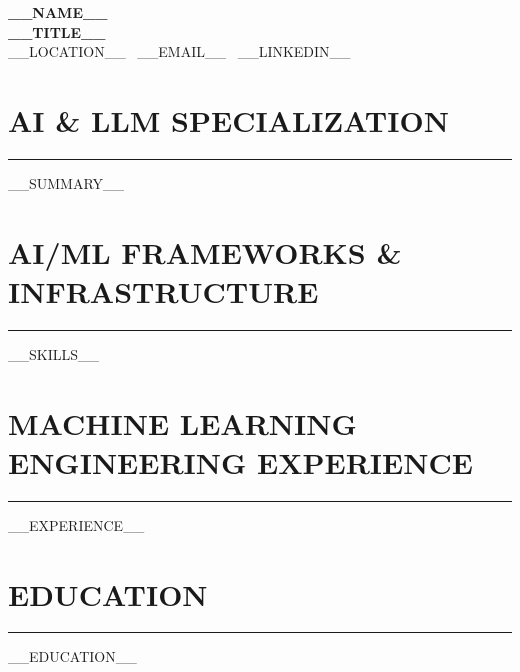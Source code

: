 \documentclass[10pt,letterpaper]{article}
\begin{document}
\begin{center}
    {\LARGE \textbf{__NAME__}} \\
    \vspace{2pt}
    \textbf{__TITLE__} \\
    __LOCATION__ \textbar\ __EMAIL__ \textbar\ __LINKEDIN__
\end{center}

\vspace{-6pt}
\section*{AI \& LLM SPECIALIZATION}
\vspace{-4pt}
\hrule
\vspace{4pt}
__SUMMARY__

\section*{AI/ML FRAMEWORKS \& INFRASTRUCTURE}
\vspace{-4pt}
\hrule
\vspace{4pt}
__SKILLS__

\section*{MACHINE LEARNING ENGINEERING EXPERIENCE}
\vspace{-4pt}
\hrule
\vspace{4pt}
__EXPERIENCE__

\section*{EDUCATION}
\vspace{-4pt}
\hrule
\vspace{4pt}
__EDUCATION__
\end{document}
